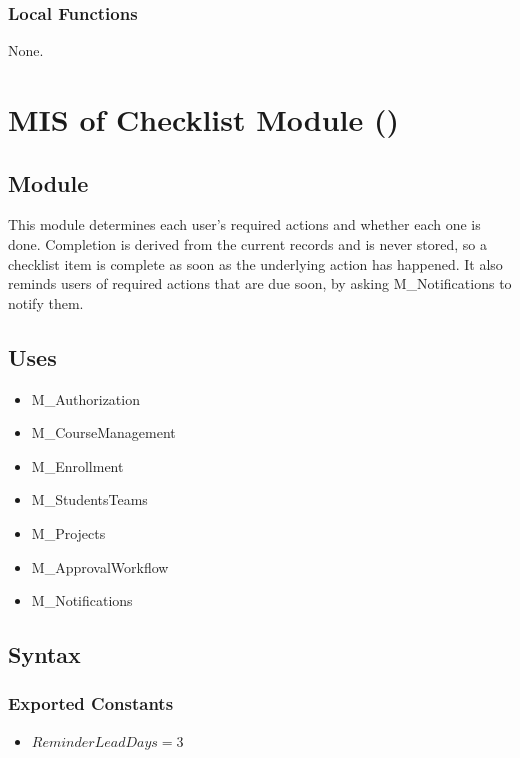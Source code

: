 \documentclass[12pt, titlepage]{article}
\newcommand{\moduleid}[1]{\texttt{\detokenize{#1}}}
\begin{document}
\subsubsection{Local Functions}
None.

\newpage

\section[MIS of Checklist Module]{MIS of Checklist Module (\moduleid{M_Checklist})}
\label{M_Checklist}

\subsection{Module}

This module determines each user's required actions and whether each one is done.
Completion is derived from the current records and is never stored, so a checklist item is complete as soon as the underlying action has happened.
It also reminds users of required actions that are due soon, by asking M\_Notifications to notify them.

\subsection{Uses}

\begin{itemize}
    \item M\_Authorization
    \item M\_CourseManagement
    \item M\_Enrollment
    \item M\_StudentsTeams
    \item M\_Projects
    \item M\_ApprovalWorkflow
    \item M\_Notifications
\end{itemize}

\subsection{Syntax}

\subsubsection{Exported Constants}
\begin{itemize}
    \item $\mathit{ReminderLeadDays}=3$
\end{itemize}
\end{document}
